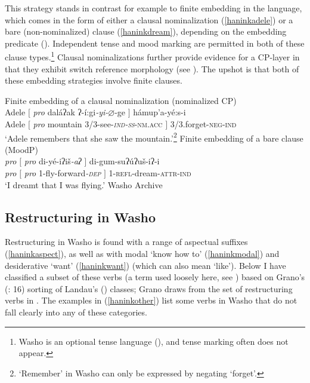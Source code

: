 \documentclass[output=paper]{langscibook}
\begin{document}
This strategy stands in contrast for example to finite embedding in the language, which comes in the form of either a clausal nominalization  (\ref{haninkadele}) or a bare (non-nominalized) clause (\ref{haninkdream}), depending on the embedding predicate (\citealt{haninkbochnak2018}). Independent tense and mood marking are permitted in both of these clause types.\footnote{Washo is an optional tense language (\citealt{bochnak2016}), and tense marking often does not appear.}  Clausal nominalizations further provide evidence for a CP-layer in that they exhibit switch reference morphology (see \citealt{arregihanink2018}). The upshot is that both of these embedding strategies involve finite clauses.

\ea Finite embedding of a clausal nominalization (nominalized CP)\\
\gll\label{haninkadele} Adele $[$ \textit{pro} daláʔak ʔ-í:gi\textit{-yi-$\varnothing$}-ge $]$ hámup'a-yé:s-i\\
{} Adele $[$ \textit{pro} mountain 3/3-see-\textit{\textsc{ind-ss}}\textsc{-nm.acc} $]$ 3/3.forget-\textsc{neg-ind}\\
\glt`Adele remembers that she saw the mountain.'\footnote{`Remember' in Washo can only be expressed by negating `forget'.}
\ex Finite embedding of a bare clause (MoodP)\\
\gll\label{haninkdream} \textit{pro} $[$ \textit{pro} di-yé-{iʔ}iš{\itshape-aʔ} $]$ di-gum-su{ʔ}ú{ʔ}uš-i{ʔ}-i \\
{} \textit{pro} $[$ \textit{pro} 1-fly-forward\textit{-\textsc{dep}} $]$ 1-\textsc{refl}-dream-\textsc{attr-ind}\\
\glt `I dreamt that I was flying.' \hfill Washo Archive
\z

\subsection{Restructuring in Washo}
Restructuring in Washo is found with a range of aspectual suffixes (\ref{haninkaspect}), as well as with modal `know how to' (\ref{haninkmodal}) and  desiderative `want' (\ref{haninkwant}) (which can also mean `like'). Below I have classified a subset of these verbs (a term used loosely here, see ) based on Grano's (\citeyear{grano2012diss}: 16) sorting of Landau's (\citeyear{landau2000}) classes; Grano draws from the set of restructuring verbs in \citet[342]{wurmbrand2001}. The examples in (\ref{haninkother}) list some verbs in Washo that do not fall clearly into any of these categories.
\end{document}
